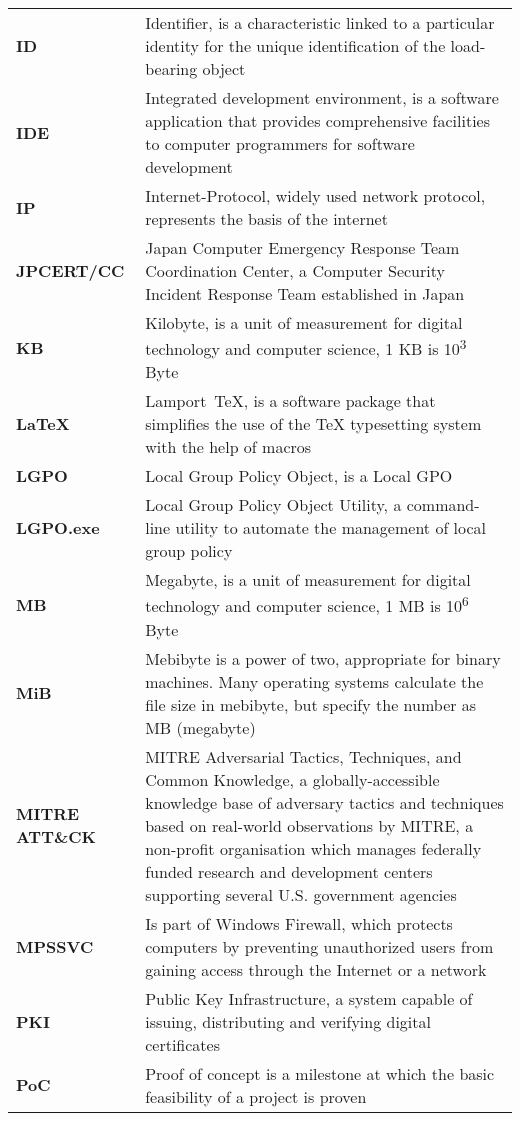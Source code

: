 \begin{longtable}{ p{4cm}  p{12cm} }
    \textbf{ID} & Identifier, is a characteristic linked to a particular identity for the unique identification of the load-bearing object\\
    \textbf{IDE} & Integrated development environment, is a software application that provides comprehensive facilities to computer programmers for software development\\
    \textbf{IP} & Internet-Protocol, widely used network protocol, represents the basis of the internet\\
    \textbf{JPCERT/CC} & Japan Computer Emergency Response Team Coordination Center, a Computer Security Incident Response Team established in Japan\\
    \textbf{KB} & Kilobyte,  is a unit of measurement for digital technology and computer science, 1 KB is 10\textsuperscript{3} Byte\\
    \textbf{LaTeX} & Lamport TeX, is a software package that simplifies the use of the TeX typesetting system with the help of macros\\
    \textbf{LGPO} & Local Group Policy Object, is a Local GPO\\
    \textbf{LGPO.exe} & Local Group Policy Object Utility, a command-line utility to automate the management of local group policy\\
    \textbf{MB} & Megabyte,  is a unit of measurement for digital technology and computer science, 1 MB is 10\textsuperscript{6} Byte\\
    \textbf{MiB} & Mebibyte is a power of two, appropriate for binary machines. Many operating systems calculate the file size in mebibyte, but specify the number as MB (megabyte)\\
    \textbf{MITRE ATT\&CK} & MITRE Adversarial Tactics, Techniques, and Common Knowledge, a globally-accessible knowledge base of adversary tactics and techniques based on real-world observations by MITRE, a non-profit organisation which manages federally funded research and development centers supporting several U.S. government agencies\\
    \textbf{MPSSVC} & Is part of Windows Firewall, which protects computers by preventing unauthorized users from gaining access through the Internet or a network\\
    \textbf{PKI} & Public Key Infrastructure,  a system capable of issuing, distributing and verifying digital certificates\\
    \textbf{PoC} & Proof of concept is a milestone at which the basic feasibility of a project is proven \\

\end{longtable}
